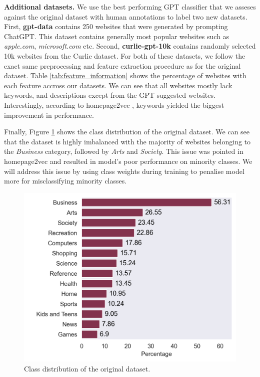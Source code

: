 \textbf{Additional datasets.} We use the best performing GPT classifier that we asseses against the original dataset with human annotations to label two new datasets. First, \textbf{gpt-data} contains 250 websites that were generated by prompting ChatGPT. This dataset contains generally most popular websites such as \textit{apple.com}, \textit{microsoft.com} etc. Second, \textbf{curlie-gpt-10k} contains randomly selected 10k websites from the Curlie dataset. For both of these datasets, we follow the exact same preprocessing and feature extraction procedure as for the original dataset. Table \ref{tab:feature_information} shows the percentage of websites with each feature accross our datasets. We can see that all websites mostly lack keywords, and descriptions except from the GPT suggested websites. Interestingly, according to homepage2vec \cite{homepage2vec}, keywords yielded the biggest improvement in performance. 

Finally, Figure \ref{fig:class_distribution} shows the class distribution of the original dataset. We can see that the dataset is highly imbalanced with the majority of websites belonging to the \textit{Business} category, followed by \textit{Arts} and \textit{Society}. This issue was pointed in homepage2vec \cite{homepage2vec} and resulted in model's poor performance on minority classes. We will 
address this issue by using class weights during training to penalise model more for misclassifying minority classes.

\begin{figure}[h!]
    \centering
    \includegraphics[width=1\columnwidth]{figures/category_distribution.png}
    \caption{Class distribution of the original dataset.}
    \label{fig:class_distribution}
\end{figure}

